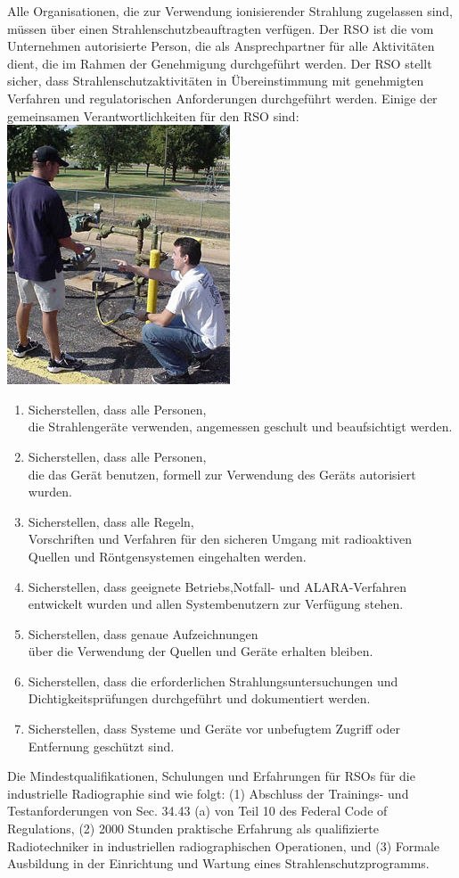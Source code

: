 {Alle Organisationen, die zur Verwendung ionisierender Strahlung zugelassen sind, müssen über einen Strahlenschutzbeauftragten verfügen. Der RSO ist die vom Unternehmen autorisierte Person, die als Ansprechpartner für alle Aktivitäten dient, die im Rahmen der Genehmigung durchgeführt werden. Der RSO stellt sicher, dass Strahlenschutzaktivitäten in Übereinstimmung mit genehmigten Verfahren und regulatorischen Anforderungen durchgeführt werden. Einige der gemeinsamen Verantwortlichkeiten für den RSO sind:\\
\includegraphics[scale=0.7]{img/rso.jpg}\\
\begin{enumerate}
  \item Sicherstellen, dass alle Personen, \\die Strahlengeräte verwenden, angemessen geschult     und beaufsichtigt werden.
  \item Sicherstellen, dass alle Personen, \\die das Gerät benutzen, formell zur Verwendung des Geräts autorisiert wurden.
  \item Sicherstellen, dass alle Regeln, \\Vorschriften und Verfahren für den sicheren Umgang mit  radioaktiven Quellen und Röntgensystemen eingehalten werden.
  \item Sicherstellen, dass geeignete Betriebs,Notfall- und ALARA-Verfahren \\entwickelt wurden und allen Systembenutzern zur Verfügung stehen.
  \item Sicherstellen, dass genaue Aufzeichnungen \\ über die Verwendung der Quellen und Geräte erhalten bleiben.
  \item Sicherstellen, dass die erforderlichen Strahlungsuntersuchungen und Dichtigkeitsprüfungen durchgeführt und dokumentiert werden.
  \item Sicherstellen, dass Systeme und Geräte vor unbefugtem Zugriff oder Entfernung geschützt sind.
\end{enumerate}
Die Mindestqualifikationen, Schulungen und Erfahrungen für RSOs für die industrielle Radiographie sind wie folgt: (1) Abschluss der Trainings- und Testanforderungen von Sec. 34.43 (a) von Teil 10 des Federal Code of Regulations, (2) 2000 Stunden praktische Erfahrung als qualifizierte Radiotechniker in industriellen radiographischen Operationen, und (3) Formale Ausbildung in der Einrichtung und Wartung eines Strahlenschutzprogramms.
}
